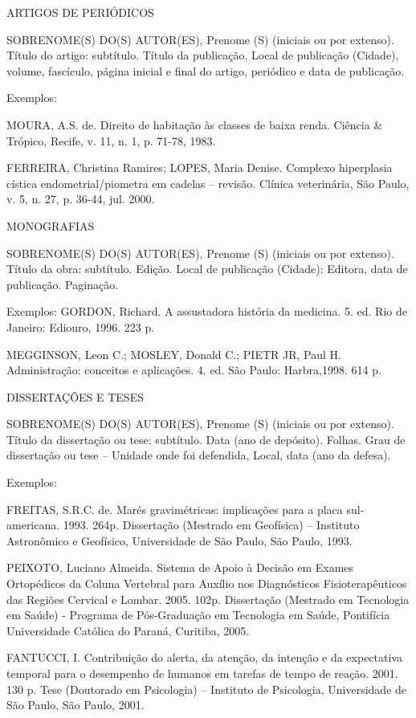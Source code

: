 ARTIGOS DE PERIÓDICOS

SOBRENOME(S) DO(S) AUTOR(ES), Prenome (S) (iniciais ou por extenso). Título do artigo: subtítulo. Título da publicação, Local de publicação (Cidade), volume, fascículo, página inicial e final do artigo, periódico e data de publicação.


Exemplos:

MOURA, A.S. de. Direito de habitação às classes de baixa renda. Ciência \& Trópico, Recife, v. 11, n. 1, p. 71-78, 1983.


FERREIRA, Christina Ramires; LOPES, Maria Denise. Complexo hiperplasia cística endometrial/piometra em cadelas – revisão. Clínica veterinária, São Paulo, v. 5, n. 27, p. 36-44, jul. 2000.


MONOGRAFIAS

SOBRENOME(S) DO(S) AUTOR(ES), Prenome (S) (iniciais ou por extenso). Título da obra: subtítulo. Edição. Local de publicação (Cidade): Editora, data de publicação. Paginação.


Exemplos:
GORDON, Richard. A assustadora história da medicina. 5. ed. Rio de Janeiro: Ediouro, 1996. 223 p.


MEGGINSON, Leon C.; MOSLEY, Donald C.; PIETR JR, Paul H. Administração: conceitos e aplicações. 4. ed. São Paulo: Harbra,1998. 614 p.


DISSERTAÇÕES E TESES

SOBRENOME(S) DO(S) AUTOR(ES), Prenome (S) (iniciais ou por extenso). Título da dissertação ou tese: subtítulo. Data (ano de depósito). Folhas. Grau de dissertação ou tese – Unidade onde foi defendida, Local, data (ano da defesa).


Exemplos:

FREITAS, S.R.C. de. Marés gravimétricas: implicações para a placa sul-americana. 1993. 264p. Dissertação (Mestrado em Geofísica) – Instituto Astronômico e Geofísico, Universidade de São Paulo, São Paulo, 1993.


PEIXOTO, Luciano Almeida. Sistema de Apoio à Decisão em Exames Ortopédicos da Coluna Vertebral para Auxílio nos Diagnósticos Fisioterapêuticos das Regiões Cervical e Lombar. 2005. 102p. Dissertação (Mestrado em Tecnologia em Saúde) - Programa de Pós-Graduação em Tecnologia em Saúde, Pontifícia Universidade Católica do Paraná, Curitiba, 2005.


FANTUCCI, I. Contribuição do alerta, da atenção, da intenção e da expectativa temporal para o desempenho de humanos em tarefas de tempo de reação. 2001. 130 p. Tese (Doutorado em Psicologia) – Instituto de Psicologia, Universidade de São Paulo, São Paulo, 2001.


